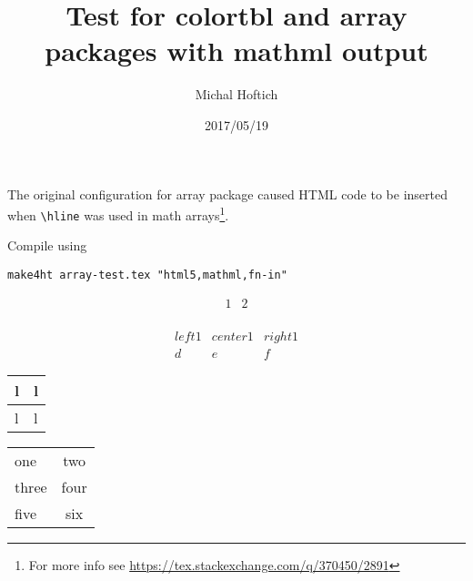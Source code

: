 \documentclass[12pt]{article}
\date{2017/05/19}
\author{Michal Hoftich}
\title{Test for colortbl and array packages with mathml output}
\begin{document}
\maketitle

The original configuration for array package caused HTML code to be inserted when \verb|\hline| was used
in math arrays\footnote{For more info see \url{https://tex.stackexchange.com/q/370450/2891}}. 

Compile using

\begin{verbatim}
make4ht array-test.tex "html5,mathml,fn-in"
\end{verbatim}


\[\begin{array}{|l|c|} \hline 1 & 2\\ \end{array}\]


\[
\begin{array}{|l|cr}
  left1 & center1 & right1\\
  \hline
  d & e & f
\end{array} 
\]

\begin{tabular}{l|l}
  l & l\\
  \hline
  l & l\\
\end{tabular}

\noindent\begin{tabular}{|l|c|}
  \rowcolor{maroon}
  one & two \\
  \rowcolor{maroon!50}
  three & four \\
  \rowcolor{maroon!10}
  five & six
\end{tabular}
\end{document}
